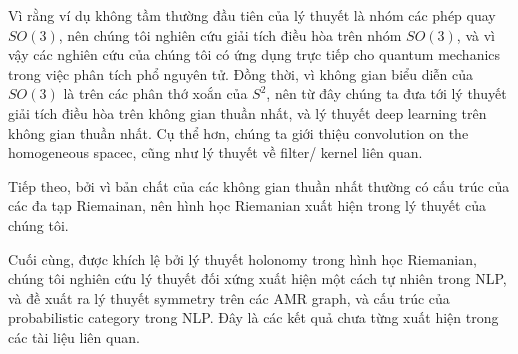 Vì rằng ví dụ không tầm thường đầu tiên của lý thuyết là nhóm các phép quay $SO(3)$, nên chúng tôi nghiên cứu giải tích điều hòa trên nhóm $SO(3)$, và vì vậy  các nghiên cứu của chúng tôi có ứng dụng trực tiếp cho quantum mechanics trong việc phân tích phổ nguyên tử. 
Đồng thời, vì không gian biểu diễn của $SO(3)$ là trên các phân thớ xoắn của $S^2$, nên từ đây chúng ta đưa tới lý thuyết giải tích điều hòa trên không gian thuần nhất, và lý thuyết deep learning trên không gian thuần nhất.
Cụ thể hơn, chúng ta giới thiệu convolution on the homogeneous spacec, cũng như lý thuyết về filter/ kernel liên quan.


Tiếp theo, bởi vì bản chất của các không gian thuần nhất thường có cấu trúc của các đa tạp Riemainan, nên hình học Riemanian xuất hiện trong lý thuyết của chúng tôi.


Cuối cùng, được khích lệ bởi lý thuyết holonomy trong hình học Riemanian, chúng tôi nghiên cứu lý thuyết đối xứng xuất hiện một cách tự nhiên trong NLP, và đề xuất ra lý thuyết  symmetry trên các AMR graph, và cấu trúc của probabilistic  category trong NLP. Đây là các kết quả chưa từng xuất hiện trong các tài liệu liên quan.  
